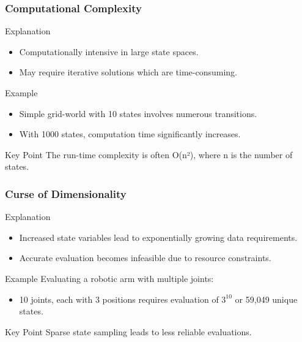 \documentclass[aspectratio=169]{beamer}
\begin{document}
\begin{frame}[fragile]
    \frametitle{Computational Complexity}
    \begin{block}{Explanation}
        \begin{itemize}
            \item Computationally intensive in large state spaces.
            \item May require iterative solutions which are time-consuming.
        \end{itemize}
    \end{block}
    
    \begin{block}{Example}
        \begin{itemize}
            \item Simple grid-world with 10 states involves numerous transitions.
            \item With 1000 states, computation time significantly increases.
        \end{itemize}
    \end{block}

    \begin{block}{Key Point}
        The run-time complexity is often O(n²), where n is the number of states.
    \end{block}
\end{frame}

\begin{frame}[fragile]
    \frametitle{Curse of Dimensionality}
    \begin{block}{Explanation}
        \begin{itemize}
            \item Increased state variables lead to exponentially growing data requirements.
            \item Accurate evaluation becomes infeasible due to resource constraints.
        \end{itemize}
    \end{block}
    
    \begin{block}{Example}
        Evaluating a robotic arm with multiple joints:
        \begin{itemize}
            \item 10 joints, each with 3 positions requires evaluation of $3^{10}$ or 59,049 unique states.
        \end{itemize}
    \end{block}

    \begin{block}{Key Point}
        Sparse state sampling leads to less reliable evaluations.
    \end{block}
\end{frame}
\end{document}
